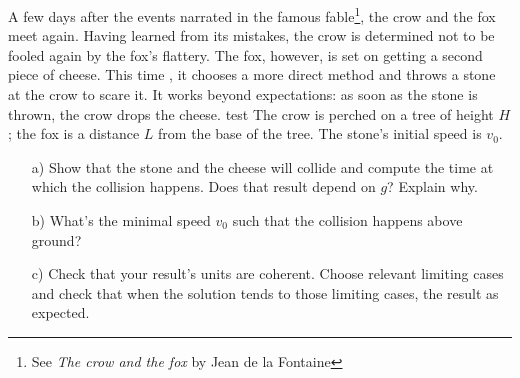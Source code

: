 %
%

\begin{center}
\vspace*{5mm}
\end{center}


A few days after the events narrated in the famous fable\footnote{See \textit{The crow and the fox} by Jean de la Fontaine}, the crow and the fox meet again. Having learned from its mistakes, the crow is determined not to be fooled again by the fox's flattery. The fox, however, is set on getting a second piece of cheese. This time , it chooses a more direct method and throws a stone at the crow to scare it. It works beyond expectations: as soon as the stone is thrown, the crow drops the cheese. test
The crow is perched on a tree of height $H$; the fox is a distance $L$ from the base of the tree. The stone's initial speed is $v_0$.
\begin{enumerate}
\item[a)] Show that the stone and the cheese will collide and compute the time at which the collision happens. Does that result depend on $g$? Explain why.
\item[b)] What's the minimal speed $v_0$ such that the collision happens above ground?
\item[c)] Check that your result's units are coherent. Choose relevant limiting cases and check that when the solution tends to those limiting cases, the result as expected.
\end{enumerate}

\begin{center}

\end{center}
